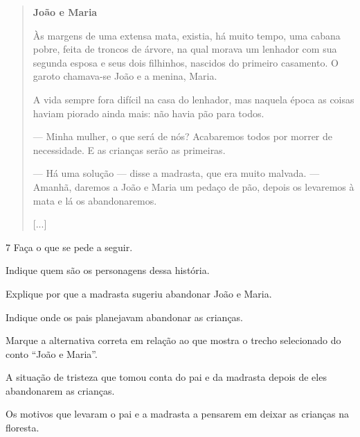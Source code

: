 \begin{quote}
\textbf{João e Maria}

Às margens de uma extensa mata, existia, há muito tempo, uma cabana
pobre, feita de troncos de árvore, na qual morava um lenhador com sua segunda esposa e
seus dois filhinhos, nascidos do primeiro casamento. O garoto chamava-se João e a
menina, Maria.

A vida sempre fora difícil na casa do lenhador, mas naquela época as
coisas haviam piorado ainda mais: não havia pão para todos.

--- Minha mulher, o que será de nós? Acabaremos todos por morrer
de necessidade. E as crianças serão as primeiras.

--- Há uma solução --- disse a madrasta, que era muito
malvada. --- Amanhã, daremos a João e Maria um pedaço de pão, depois os
levaremos à mata e lá os abandonaremos.

{[}...{]}

\end{quote}

\num{7} Faça o que se pede a seguir.

\begin{escolha}
\item Indique quem são os personagens dessa história.


\item Explique por que a madrasta sugeriu abandonar João e Maria.


\item Indique onde os pais planejavam abandonar as crianças.


\item Marque a alternativa correta em relação ao que mostra o trecho
selecionado do conto ``João e Maria''.

\begin{boxlist}
\boxitem[] A situação de tristeza que tomou conta do pai e da madrasta depois
de eles abandonarem as crianças.

\boxitem[X] Os motivos que levaram o pai e a madrasta a pensarem em deixar as
crianças na floresta.
\end{boxlist}
\end{escolha}

